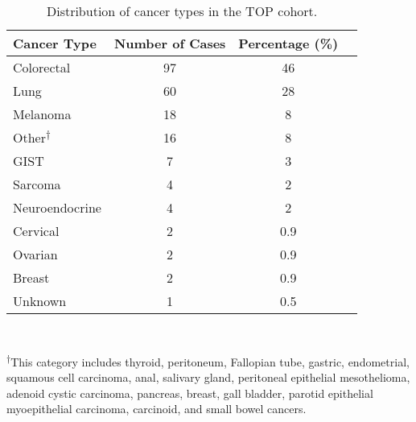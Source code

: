 \documentclass{bmcart}
\begin{document}
\begin{backmatter}
\begin{table}[H]
\caption{Distribution of cancer types in the TOP cohort.}
\label{cancertypes}
\centering
      \begin{tabular}{lccc}
        \hline
        Cancer Type & Number of Cases & Percentage (\%) \\ \hline
        Colorectal & 97 & 46 \\
        Lung & 60 & 28 \\
        Melanoma & 18 & 8 \\
				Other\textsuperscript{$\dagger$} & 16 & 8 \\
				GIST & 7 & 3 \\
				Sarcoma & 4 & 2 \\
				Neuroendocrine & 4 & 2 \\
				Cervical & 2 & 0.9 \\
				Ovarian & 2 & 0.9 \\
				Breast & 2 & 0.9 \\
				Unknown & 1 & 0.5 \\ \hline
      \end{tabular} \\
			\vspace{0.3cm}
\raggedright
\textsuperscript{$\dagger$}This category includes thyroid, peritoneum, Fallopian tube, gastric, endometrial, squamous cell carcinoma, anal, salivary gland, peritoneal epithelial mesothelioma, adenoid cystic carcinoma, pancreas, breast, gall bladder, parotid epithelial myoepithelial carcinoma, carcinoid, and small bowel cancers.
\end{table}


\end{backmatter}
\end{document}
